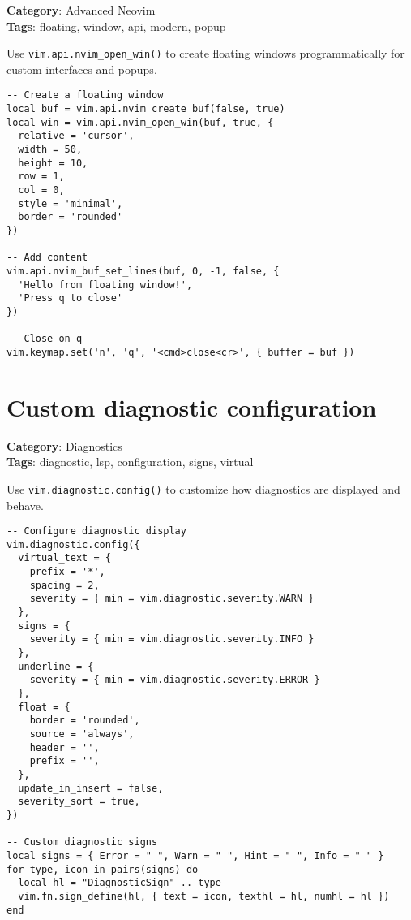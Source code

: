{{{{{{\textbf{Category}: Advanced Neovim\\ \textbf{Tags}: floating, window, api, modern, popup
\vspace{0.5cm}

Use {\footnotesize \Verb§vim.api.nvim_open_win()§} to create floating windows programmatically for custom interfaces and popups.

\begin{Exa*}{}
\begin{Verbatim}[fontsize=\footnotesize, breaklines, breakanywhere]
-- Create a floating window
local buf = vim.api.nvim_create_buf(false, true)
local win = vim.api.nvim_open_win(buf, true, {
  relative = 'cursor',
  width = 50,
  height = 10,
  row = 1,
  col = 0,
  style = 'minimal',
  border = 'rounded'
})

-- Add content
vim.api.nvim_buf_set_lines(buf, 0, -1, false, {
  'Hello from floating window!',
  'Press q to close'
})

-- Close on q
vim.keymap.set('n', 'q', '<cmd>close<cr>', { buffer = buf })
\end{Verbatim}
\end{Exa*}

\section{Custom diagnostic configuration}

\textbf{Category}: Diagnostics\\ \textbf{Tags}: diagnostic, lsp, configuration, signs, virtual
\vspace{0.5cm}

Use {\footnotesize \Verb§vim.diagnostic.config()§} to customize how diagnostics are displayed and behave.

\begin{Exa*}{}
\begin{Verbatim}[fontsize=\footnotesize, breaklines, breakanywhere]
-- Configure diagnostic display
vim.diagnostic.config({
  virtual_text = {
    prefix = '*',
    spacing = 2,
    severity = { min = vim.diagnostic.severity.WARN }
  },
  signs = {
    severity = { min = vim.diagnostic.severity.INFO }
  },
  underline = {
    severity = { min = vim.diagnostic.severity.ERROR }
  },
  float = {
    border = 'rounded',
    source = 'always',
    header = '',
    prefix = '',
  },
  update_in_insert = false,
  severity_sort = true,
})

-- Custom diagnostic signs
local signs = { Error = " ", Warn = " ", Hint = " ", Info = " " }
for type, icon in pairs(signs) do
  local hl = "DiagnosticSign" .. type
  vim.fn.sign_define(hl, { text = icon, texthl = hl, numhl = hl })
end
\end{Verbatim}
\end{Exa*}

}}}}}}
